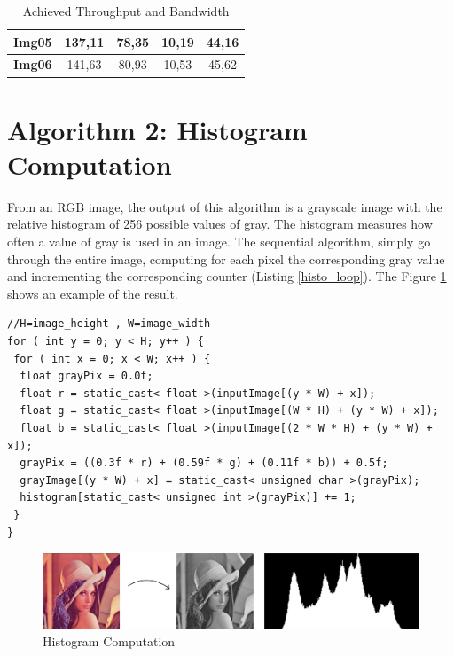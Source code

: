 \documentclass[a4paper]{article}
\begin{document}
\begin{table}[!ht]
\begin{tabular}{|c|c|c|c|c|}
\textbf{Img05} & 137,11                                                                            & 78,35                                                                         & 10,19                                                                        & 44,16                                                                          \\ \hline
\textbf{Img06} & 141,63                                                                            & 80,93                                                                         & 10,53                                                                        & 45,62                                                                          \\ \hline
\end{tabular}
\caption{Achieved Throughput and Bandwidth}
\end{table}
\FloatBarrier


\section{Algorithm 2: Histogram Computation}
\label{sec:hc}
From an RGB image, the output of this algorithm is a grayscale image with the relative histogram of 256 possible values of gray.
The histogram measures how often a value of gray is used in an image. The sequential algorithm, simply go through the entire image, computing for each pixel the corresponding gray value and incrementing the corresponding counter (Listing \ref{histo_loop}). The Figure \ref{fig:histo} shows an example of the result.

\begin{lstlisting}[label=histo_loop, caption=Sequential code]
//H=image_height , W=image_width
for ( int y = 0; y < H; y++ ) {
 for ( int x = 0; x < W; x++ ) {
  float grayPix = 0.0f;
  float r = static_cast< float >(inputImage[(y * W) + x]);
  float g = static_cast< float >(inputImage[(W * H) + (y * W) + x]);
  float b = static_cast< float >(inputImage[(2 * W * H) + (y * W) + x]);
  grayPix = ((0.3f * r) + (0.59f * g) + (0.11f * b)) + 0.5f;
  grayImage[(y * W) + x] = static_cast< unsigned char >(grayPix);
  histogram[static_cast< unsigned int >(grayPix)] += 1;
 }
}
\end{lstlisting}

\begin{figure}[!ht]
    \centering
    \includegraphics[width=0.7\linewidth]{histo}
    \caption{Histogram Computation}
    \label{fig:histo}
\end{figure}
\FloatBarrier
\end{document}
